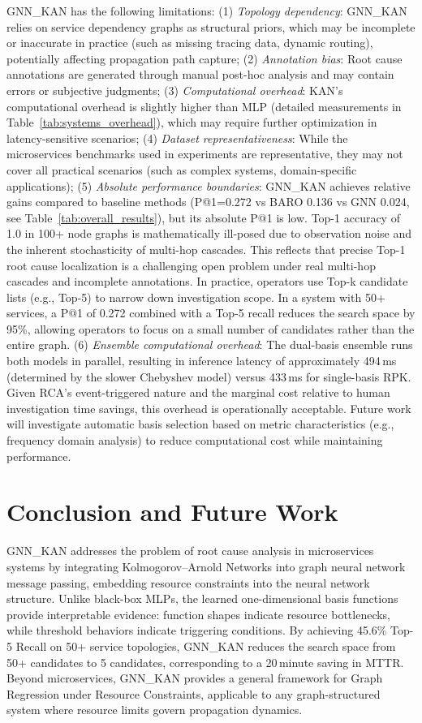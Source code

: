 \documentclass[conference]{IEEEtran}
\begin{document}
GNN\_KAN has the following limitations: (1) \textit{Topology dependency}: GNN\_KAN relies on service dependency graphs as structural priors, which may be incomplete or inaccurate in practice (such as missing tracing data, dynamic routing), potentially affecting propagation path capture; (2) \textit{Annotation bias}: Root cause annotations are generated through manual post-hoc analysis and may contain errors or subjective judgments; (3) \textit{Computational overhead}: KAN's computational overhead is slightly higher than MLP (detailed measurements in Table~\ref{tab:systems_overhead}), which may require further optimization in latency-sensitive scenarios; (4) \textit{Dataset representativeness}: While the microservices benchmarks used in experiments are representative, they may not cover all practical scenarios (such as complex systems, domain-specific applications); (5) \textit{Absolute performance boundaries}: GNN\_KAN achieves relative gains compared to baseline methods (P@1=0.272 vs BARO 0.136 vs GNN 0.024, see Table~\ref{tab:overall_results}), but its absolute P@1 is low. Top-1 accuracy of 1.0 in 100+ node graphs is mathematically ill-posed due to observation noise and the inherent stochasticity of multi-hop cascades. This reflects that precise Top-1 root cause localization is a challenging open problem under real multi-hop cascades and incomplete annotations. In practice, operators use Top-k candidate lists (e.g., Top-5) to narrow down investigation scope. In a system with 50+ services, a P@1 of 0.272 combined with a Top-5 recall reduces the search space by 95\%, allowing operators to focus on a small number of candidates rather than the entire graph. (6) \textit{Ensemble computational overhead}: The dual-basis ensemble runs both models in parallel, resulting in inference latency of approximately 494\,ms (determined by the slower Chebyshev model) versus 433\,ms for single-basis RPK. Given RCA's event-triggered nature and the marginal cost relative to human investigation time savings, this overhead is operationally acceptable. Future work will investigate automatic basis selection based on metric characteristics (e.g., frequency domain analysis) to reduce computational cost while maintaining performance.

\section{Conclusion and Future Work}

GNN\_KAN addresses the problem of root cause analysis in microservices systems by integrating Kolmogorov--Arnold Networks into graph neural network message passing, embedding resource constraints into the neural network structure. Unlike black-box MLPs, the learned one-dimensional basis functions provide interpretable evidence: function shapes indicate resource bottlenecks, while threshold behaviors indicate triggering conditions. By achieving 45.6\% Top-5 Recall on 50+ service topologies, GNN\_KAN reduces the search space from 50+ candidates to 5 candidates, corresponding to a 20\,minute saving in MTTR. Beyond microservices, GNN\_KAN provides a general framework for Graph Regression under Resource Constraints, applicable to any graph-structured system where resource limits govern propagation dynamics.
\end{document}
